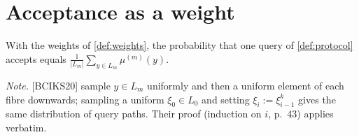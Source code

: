 \section{Acceptance as a weight}

\begin{imported}\label{ext:claim85}
With the weights of \cref{def:weights}, the probability that one query of
\cref{def:protocol} accepts equals $\frac1{|L_m|}\sum_{y\in L_m}\mu^{(m)}(y)$.
\end{imported}
\noindent\emph{Note.} [BCIKS20] sample $y\in L_m$ uniformly and then a uniform element of
each fibre downwards; sampling a uniform $\xi_0\in L_0$ and setting $\xi_i:=\xi_{i-1}^k$ gives
the same distribution of query paths. Their proof (induction on $i$, p.~43) applies
verbatim.
